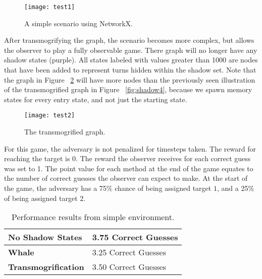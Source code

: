 \begin{figure}[h!]
\begin{center}

  \texttt{[image: test1]}
  \end{center}

  \caption{A simple scenario using NetworkX.}
  
  \label{fig:test1}
\end{figure}

After transmogrifying the graph, the scenario becomes more complex, but allows the observer to play a fully observable game. There graph will no longer have any shadow states (purple). All states labeled with values greater than 1000 are nodes that have been added to represent turns hidden within the shadow set. Note that the graph in Figure ~\ref{fig:test2} will have more nodes than the previously seen illustration of the transmogrified graph in Figure ~\ref{fig:shadow4}, because we spawn memory states for every entry state, and not just the starting state. 

\begin{figure}[h!]
\begin{center}

  \texttt{[image: test2]}
  \end{center}

  \caption{The transmogrified graph.}
  
  \label{fig:test2}
\end{figure}

For this game, the adversary is not penalized for timesteps taken. The reward for reaching the target is 0. The reward the observer receives for each correct guess was set to 1. The point value for each method at the end of the game equates to the number of correct guesses the observer can expect to make. At the start of the game, the adversary has a 75\% chance of being assigned target $1$, and a 25\% of being assigned target $2$.

\begin{table}[hbtp]
\begin{center}
\begin{tabular}{|l|l|}
\hline 
\textbf{No Shadow States} & 3.75 Correct Guesses\\
\hline
\textbf{Whale} & 3.25 Correct Guesses\\
\hline
\textbf{Transmogrification} & 3.50 Correct Guesses\\
\hline
\end{tabular}
\end{center}
\caption{Performance results from simple environment.}
\label{table:simpletable}
\end{table}

